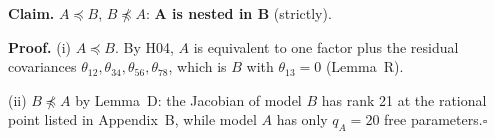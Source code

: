 \documentclass[10pt,a4paper]{article}
\newcommand{\nest}{\preceq}
\newcommand{\nnest}{\not\preceq}
\begin{document}
\par\bigskip
\noindent\textbf{Claim.} $A \nest B$, $B \nnest A$: \textbf{A is nested in B} (strictly).\par\smallskip
\noindent\textbf{Proof.} (i) $A\nest B$. By H04, $A$ is equivalent to one factor plus the residual covariances $\theta_{12},\theta_{34},\theta_{56},\theta_{78}$, which is $B$ with $\theta_{13}=0$ (Lemma~R).\par\smallskip
\noindent(ii) $B\nnest A$ by Lemma~D: the Jacobian of model $B$ has rank 21 at the rational point listed in Appendix~B, while model $A$ has only $q_A=20$ free parameters.\hfill$\square$\par\medskip
{}

\clearpage
\end{document}

